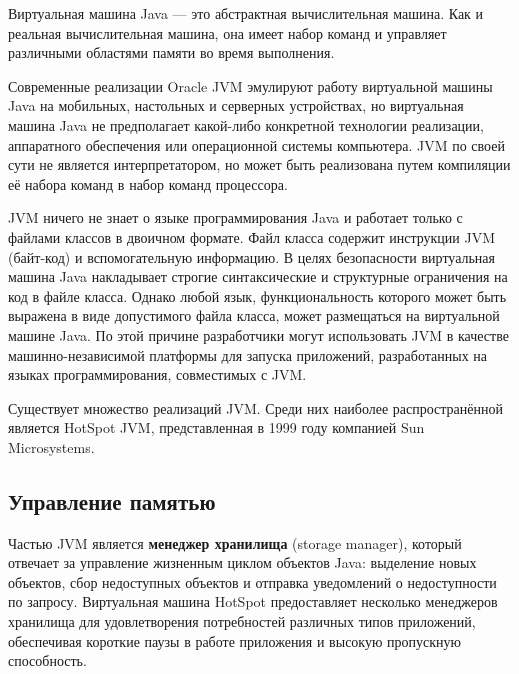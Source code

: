 Виртуальная машина Java \cite{java_21_spec} --- это абстрактная вычислительная машина. Как и реальная вычислительная машина, она имеет набор команд и управляет различными областями памяти во время выполнения.

Современные реализации Oracle JVM эмулируют работу виртуальной машины Java на мобильных, настольных и серверных устройствах, но виртуальная машина Java не предполагает какой-либо конкретной технологии реализации, аппаратного обеспечения или операционной системы компьютера. JVM по своей сути не является интерпретатором, но может быть реализована путем компиляции её набора команд в набор команд процессора. \cite{java_21_spec}

JVM ничего не знает о языке программирования Java и работает только с файлами классов в двоичном формате. Файл класса содержит инструкции JVM (байт-код) и вспомогательную информацию. \cite{java_21_spec} В целях безопасности виртуальная машина Java накладывает строгие синтаксические и структурные ограничения на код в файле класса. Однако любой язык, функциональность которого может быть выражена в виде допустимого файла класса, может размещаться на виртуальной машине Java. По этой причине разработчики могут использовать JVM в качестве машинно-независимой платформы для запуска приложений, разработанных на языках программирования, совместимых с JVM. \cite{java_jvm_languages}

Существует множество реализаций JVM. \cite{java_j9} \cite{java_codename_one} \cite{java_graalvm}
Среди них наиболее распространённой является HotSpot JVM, представленная в 1999 году компанией Sun Microsystems. \cite{java_hotspot} %



\subsection{Управление памятью}

Частью JVM является \textbf{менеджер хранилища} (storage manager), который отвечает за управление жизненным циклом объектов Java: выделение новых объектов, сбор недоступных объектов и отправка уведомлений о недоступности по запросу. Виртуальная машина HotSpot предоставляет несколько менеджеров хранилища для удовлетворения потребностей различных типов приложений, обеспечивая короткие паузы в работе приложения и высокую пропускную способность. \cite{java_storage_management}

